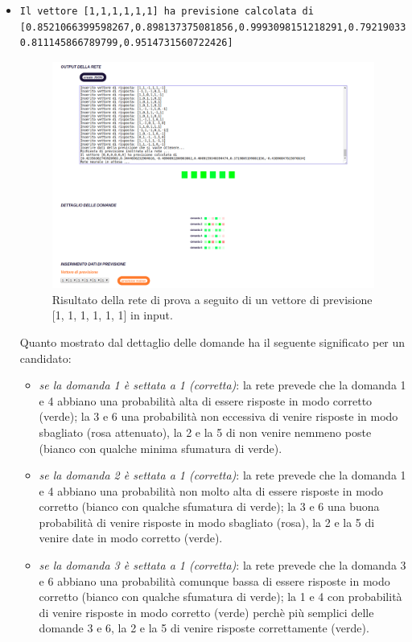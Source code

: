 \begin{itemize}
\item \begin{verbatim}Il vettore [1,1,1,1,1,1] ha previsione calcolata di
[0.8521066399598267,0.898137375081856,0.9993098151218291,0.792190337086403,
0.811145866789799,0.9514731560722426]
\end{verbatim}

\begin{figure}[H]
\centering
	\includegraphics[width=0.90\linewidth]{./image/rete_prova-vp1.png}
	\caption{Risultato della rete di prova a seguito di un vettore di previsione [1, 1, 1, 1, 1, 1] in input.}
\end{figure}
Quanto mostrato dal dettaglio delle domande ha il seguente significato per un candidato:
\begin{itemize}
\item \textit{se la domanda 1 \`e settata a 1 (corretta)}: la rete prevede che la domanda 1 e 4 abbiano una probabilit\`a alta di essere risposte in modo corretto (verde); la 3 e 6 una probabilit\`a non eccessiva di venire risposte in modo sbagliato (rosa attenuato), la 2 e la 5 di non venire nemmeno poste (bianco con qualche minima sfumatura di verde).
\item \textit{se la domanda 2 \`e settata a 1 (corretta)}: la rete prevede che la domanda 1 e 4 abbiano una probabilit\`a non molto alta di essere risposte in modo corretto (bianco con qualche sfumatura di verde); la 3 e 6 una buona probabilit\`a di venire risposte in modo sbagliato (rosa), la 2 e la 5 di venire date in modo corretto (verde).
\item \textit{se la domanda 3 \`e settata a 1 (corretta)}: la rete prevede che la domanda 3 e 6 abbiano una probabilit\`a comunque bassa di essere risposte in modo corretto (bianco con qualche sfumatura di verde); la 1 e 4 con probabilit\`a di venire risposte in modo corretto (verde) perch\`e pi\`u semplici delle domande 3 e 6, la 2 e la 5 di venire risposte correttamente (verde).

\end{itemize}
\end{itemize}
